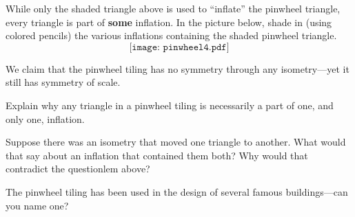 \documentclass[noauthor,nooutcomes,handout,hints,12pt]{ximera}
\begin{document}
\begin{question}
While only the shaded triangle above is used to ``inflate'' the
pinwheel triangle, every triangle is part of \textbf{some}
inflation. In the picture below, shade in (using colored pencils) the
various inflations containing the shaded pinwheel triangle.
\[
\texttt{[image: pinwheel4.pdf]}
\]
\end{question}


We claim that the pinwheel tiling has no symmetry through any
isometry---yet it still has symmetry of scale.


\begin{question}
Explain why any triangle in a pinwheel tiling is necessarily a part of
one, and only one, inflation.
\end{question}


\begin{question}
Suppose there was an isometry that moved one triangle to another. What
would that say about an inflation that contained them both? Why would
that contradict the questionlem above?
\end{question}


\begin{question}
The pinwheel tiling has been used in the design of several famous
buildings---can you name one?
\end{question}
\end{document}
